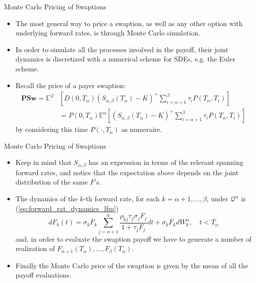 \documentclass{beamer}
\begin{document}
\begin{frame}{Monte Carlo Pricing of Swaptions}
  \begin{itemize}
  \item<1-> The most general way to price a swaption, as well as any other option with underlying forward rates, is through Monte Carlo simulation. 
  \item<2-> In order to simulate all the processes involved in the payoff, their joint dynamics is discretized with a numerical scheme for SDEs, e.g. the Euler scheme.
  \item<3-> Recall the price of a payer swaption:
    \begin{equation*}
      \begin{aligned}
        \textbf{PSw} = \mathbb{E}^\mathcal{Q}&\left[D(0, T_\alpha) (S_{\alpha,\beta}(T_\alpha) - K)^+ \sum_{i=\alpha+1}^\beta \tau_i P(T_\alpha, T_i)\right] \\
        &= P(0, T_\alpha)\mathbb{E}^\alpha\left[(S_{\alpha, \beta}(T_\alpha) - K)^+ \sum^\beta_{i=\alpha+1} \tau_i P(T_\alpha, T_i)\right]
      \end{aligned}
    \end{equation*}
    by considering this time $P(\cdot, T_\alpha)$ as numeraire.
  \end{itemize}
\end{frame}

\begin{frame}{Monte Carlo Pricing of Swaptions}
  \begin{itemize}
  \item<1-> Keep in mind that $S_{\alpha,\beta}$ has an expression in terms of the relevant spanning forward rates, and notice that the expectation above depends on the joint distribution of the same $F$’s.
  \item<2-> The dynamics of the $k$-th forward rate, for each $k = \alpha + 1,\ldots, \beta$, under $\mathcal{Q}^\alpha$ is (\cref{eq:forward_rat_dynamics_lfm})
\begin{equation}
  dF_k(t) = \sigma_kF_k\sum_{j=\alpha+1}^k\frac{\rho_{kj}\tau_j\sigma_jF_j}{1+\tau_jF_j}dt+\sigma_kF_k dW^\alpha_k, \quad t<T_\alpha
  \label{eq:dynamics_4.1}
\end{equation}
and, in order to evaluate the swaption payoff we have to generate a number of realization of $F_{\alpha+1}(T_\alpha),\ldots, F_\beta(T_\alpha)$. 
\item<3-> Finally the Monte Carlo price of the swaption is given by the mean of all the payoff evaluations.
  \end{itemize}
\end{frame}
\end{document}
